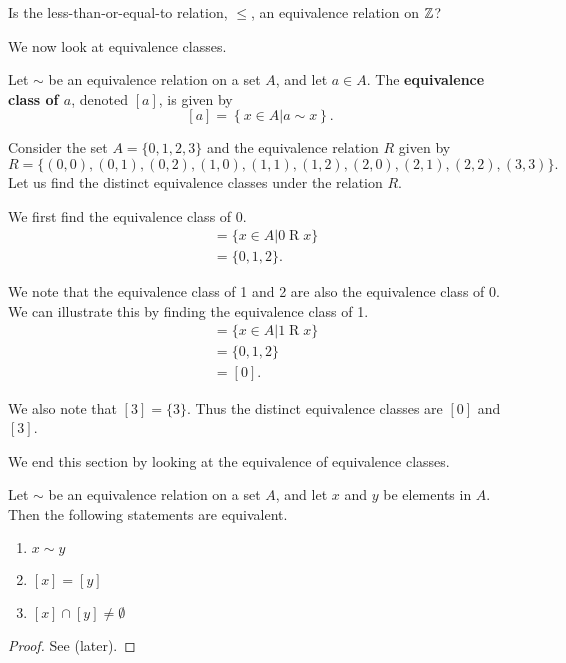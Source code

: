 \begin{exercise}
    Is the less-than-or-equal-to relation, $\leq$, an equivalence relation on $\mathbb{Z}$?
\end{exercise}

We now look at equivalence classes.

\begin{definition}
    Let $\sim$ be an equivalence relation on a set $A$, and let $a \in A$. The \textbf{equivalence class of $a$}, denoted $[a]$, is given by
    \[
        [a] = \left\{x \in A \vert a\mathrel{\sim}x\right\}.
    \]
\end{definition}

\begin{example}
    Consider the set $A = \{0, 1, 2, 3\}$ and the equivalence relation $R$ given by
    \[
        R = \{(0, 0), (0, 1), (0, 2), (1, 0), (1, 1), (1, 2), (2, 0), (2, 1), (2, 2), (3, 3)\}.
    \]
    Let us find the distinct equivalence classes under the relation $R$.

    We first find the equivalence class of 0.
    \begin{align*}
        [0] &= \{x \in A \vert 0 \mathrel{R} x\}\\
        &= \{0, 1, 2\}.
    \end{align*}

    We note that the equivalence class of 1 and 2 are also the equivalence class of 0. We can illustrate this by finding the equivalence class of 1.
    \begin{align*}
        [1] &= \{x \in A \vert 1 \mathrel{R} x\}\\
        &= \{0, 1, 2\}\\
        &= [0].
    \end{align*}

    We also note that $[3] = \{3\}$. Thus the distinct equivalence classes are $[0]$ and $[3]$.
\end{example}

We end this section by looking at the equivalence of equivalence classes.
\begin{theorem}\label{thrm-equivalence-class-equivalence}
    Let $\sim$ be an equivalence relation on a set $A$, and let $x$ and $y$ be elements in $A$. Then the following statements are equivalent.
    \begin{enumerate}
        \item $x \mathrel{\sim} y$
        \item $[x] = [y]$
        \item $[x] \cap [y] \neq \emptyset$
    \end{enumerate}
\end{theorem}
\begin{proof}
    See  (later).
\end{proof}

